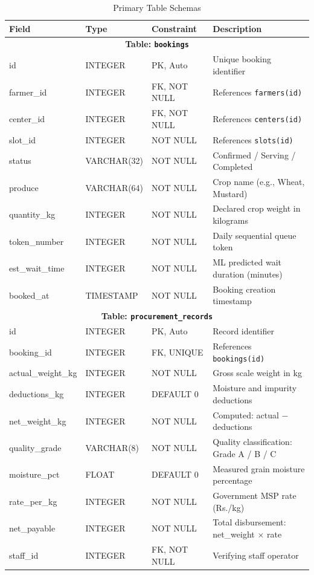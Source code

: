 \begin{table}[H]
\centering
\caption{Primary Table Schemas}
\label{tab:schema}
\renewcommand{\arraystretch}{1.15}
\begin{tabular}{|p{3.2cm}|p{2.5cm}|p{2.2cm}|p{5.5cm}|}
\hline
\textbf{Field} & \textbf{Type} & \textbf{Constraint} & \textbf{Description} \\ \hline
\multicolumn{4}{|c|}{\textbf{Table: \texttt{bookings}}} \\ \hline
id & INTEGER & PK, Auto & Unique booking identifier \\ \hline
farmer\_id & INTEGER & FK, NOT NULL & References \texttt{farmers(id)} \\ \hline
center\_id & INTEGER & FK, NOT NULL & References \texttt{centers(id)} \\ \hline
slot\_id & INTEGER & NOT NULL & References \texttt{slots(id)} \\ \hline
status & VARCHAR(32) & NOT NULL & Confirmed / Serving / Completed \\ \hline
produce & VARCHAR(64) & NOT NULL & Crop name (e.g., Wheat, Mustard) \\ \hline
quantity\_kg & INTEGER & NOT NULL & Declared crop weight in kilograms \\ \hline
token\_number & INTEGER & NOT NULL & Daily sequential queue token \\ \hline
est\_wait\_time & INTEGER & NOT NULL & ML predicted wait duration (minutes) \\ \hline
booked\_at & TIMESTAMP & NOT NULL & Booking creation timestamp \\ \hline
\multicolumn{4}{|c|}{\textbf{Table: \texttt{procurement\_records}}} \\ \hline
id & INTEGER & PK, Auto & Record identifier \\ \hline
booking\_id & INTEGER & FK, UNIQUE & References \texttt{bookings(id)} \\ \hline
actual\_weight\_kg & INTEGER & NOT NULL & Gross scale weight in kg \\ \hline
deductions\_kg & INTEGER & DEFAULT 0 & Moisture and impurity deductions \\ \hline
net\_weight\_kg & INTEGER & NOT NULL & Computed: actual $-$ deductions \\ \hline
quality\_grade & VARCHAR(8) & NOT NULL & Quality classification: Grade A / B / C \\ \hline
moisture\_pct & FLOAT & DEFAULT 0 & Measured grain moisture percentage \\ \hline
rate\_per\_kg & INTEGER & NOT NULL & Government MSP rate (Rs./kg) \\ \hline
net\_payable & INTEGER & NOT NULL & Total disbursement: net\_weight $\times$ rate \\ \hline
staff\_id & INTEGER & FK, NOT NULL & Verifying staff operator \\ \hline
\end{tabular}
\end{table}

